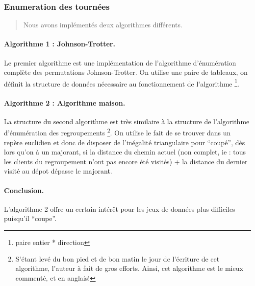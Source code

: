 \documentclass[a4paper,10pt]{article}
\begin{document}
\subsubsection{Enumeration des tournées}

\begin{quote}
  Nous avons implémentés deux algorithmes différents.
\end{quote}
\paragraph{Algorithme 1 : Johnson-Trotter.}

Le premier algorithme est une implémentation de l'algorithme d'énumération complète des permutations Johnson-Trotter.
On utilise une paire de tableaux, on définit la structure de données nécessaire au fonctionnement de l'algorithme
\footnote{paire entier * direction}.

\paragraph{Algorithme 2 : Algorithme maison.}

La structure du second algorithme est très similaire à la structure de l'algorithme d'énumération des regroupements
\footnote{S'étant levé du bon pied et de bon matin le jour de l'écriture de cet algorithme, l'auteur à fait de gros
  efforts. Ainsi, cet algorithme est le mieux commenté, et en anglais! }. 
On utilise le fait de se trouver dans un repère euclidien et donc de disposer de l'inégalité triangulaire pour ``coupé'',
dès lors qu'on à un majorant, si la distance du chemin actuel (non complet, ie : tous les clients du regroupement
n'ont pas encore été visités) + la distance du dernier visité au dépot dépasse le majorant.

\paragraph{Conclusion.}

L'algorithme 2 offre un certain intérêt pour les jeux de données plus difficiles puisqu'il ``coupe''.
\end{document}
